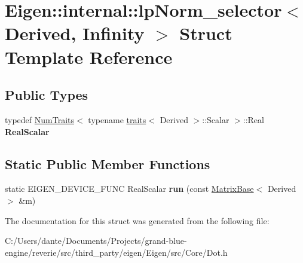 \hypertarget{struct_eigen_1_1internal_1_1lp_norm__selector_3_01_derived_00_01_infinity_01_4}{}\section{Eigen\+::internal\+::lp\+Norm\+\_\+selector$<$ Derived, Infinity $>$ Struct Template Reference}
\label{struct_eigen_1_1internal_1_1lp_norm__selector_3_01_derived_00_01_infinity_01_4}
\subsection*{Public Types}
\begin{DoxyCompactItemize}
\item 
\mbox{\label{struct_eigen_1_1internal_1_1lp_norm__selector_3_01_derived_00_01_infinity_01_4_ad0a33c31e969d5226e28242d657decd6}} 
typedef \mbox{\hyperlink{struct_eigen_1_1_num_traits}{Num\+Traits}}$<$ typename \mbox{\hyperlink{struct_eigen_1_1internal_1_1traits}{traits}}$<$ Derived $>$\+::Scalar $>$\+::Real {\bfseries Real\+Scalar}
\end{DoxyCompactItemize}
\subsection*{Static Public Member Functions}
\begin{DoxyCompactItemize}
\item 
\mbox{\label{struct_eigen_1_1internal_1_1lp_norm__selector_3_01_derived_00_01_infinity_01_4_a80aeefb51897e03ff09bdaf97998ab26}} 
static E\+I\+G\+E\+N\+\_\+\+D\+E\+V\+I\+C\+E\+\_\+\+F\+U\+NC Real\+Scalar {\bfseries run} (const \mbox{\hyperlink{class_eigen_1_1_matrix_base}{Matrix\+Base}}$<$ Derived $>$ \&m)
\end{DoxyCompactItemize}


The documentation for this struct was generated from the following file\+:\begin{DoxyCompactItemize}
\item 
C\+:/\+Users/dante/\+Documents/\+Projects/grand-\/blue-\/engine/reverie/src/third\+\_\+party/eigen/\+Eigen/src/\+Core/Dot.\+h\end{DoxyCompactItemize}
